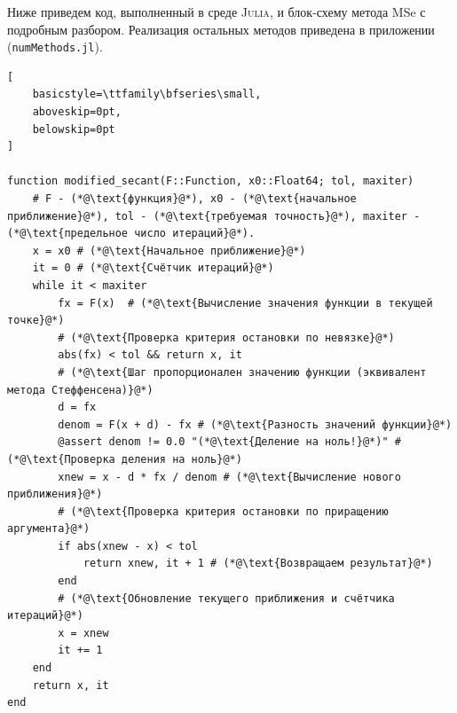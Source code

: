 \documentclass[12pt,a4paper]{article}
\theoremstyle{bigplain}
\theoremstyle{plain}
\begin{document}
\vspace{4pt}
Ниже приведем код, выполненный в среде \textsc{Julia}, и блок-схему метода MSe с подробным разбором. Реализация остальных методов приведена в приложении (\texttt{numMethods.jl}).



\vspace{-10pt}
\begin{lstlisting}[
    basicstyle=\ttfamily\bfseries\small,
    aboveskip=0pt,
    belowskip=0pt
]

function modified_secant(F::Function, x0::Float64; tol, maxiter)
    # F - (*@\text{функция}@*), x0 - (*@\text{начальное приближение}@*), tol - (*@\text{требуемая точность}@*), maxiter - (*@\text{предельное число итераций}@*).
    x = x0 # (*@\text{Начальное приближение}@*)
    it = 0 # (*@\text{Счётчик итераций}@*)
    while it < maxiter 
        fx = F(x)  # (*@\text{Вычисление значения функции в текущей точке}@*)
        # (*@\text{Проверка критерия остановки по невязке}@*)
        abs(fx) < tol && return x, it 
        # (*@\text{Шаг пропорционален значению функции (эквивалент метода Стеффенсена)}@*)
        d = fx 
        denom = F(x + d) - fx # (*@\text{Разность значений функции}@*)
        @assert denom != 0.0 "(*@\text{Деление на ноль!}@*)" # (*@\text{Проверка деления на ноль}@*)
        xnew = x - d * fx / denom # (*@\text{Вычисление нового приближения}@*)
        # (*@\text{Проверка критерия остановки по приращению аргумента}@*)
        if abs(xnew - x) < tol
            return xnew, it + 1 # (*@\text{Возвращаем результат}@*)
        end
        # (*@\text{Обновление текущего приближения и счётчика итераций}@*)
        x = xnew
        it += 1
    end
    return x, it
end

\end{lstlisting}
\end{document}
